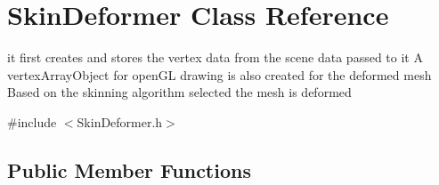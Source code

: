 \hypertarget{class_skin_deformer}{\section{Skin\-Deformer Class Reference}
\label{class_skin_deformer}
}


it first creates and stores the vertex data from the scene data passed to it A vertex\-Array\-Object for open\-G\-L drawing is also created for the deformed mesh Based on the skinning algorithm selected the mesh is deformed  




{\ttfamily \#include $<$Skin\-Deformer.\-h$>$}

\subsection*{Public Member Functions}
